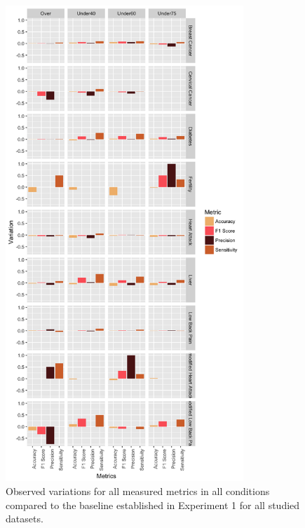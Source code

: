 \begin{figure}[!htbp]
    \centering
    \includegraphics[width=0.8\textwidth]{ThesisTemplate/usingLatex/chapter5Images/AllMetricsPortrait.png}
    \caption{Observed variations for all measured metrics in all conditions compared to the baseline established in Experiment 1 for all studied datasets.}
    \label{fig:allVar}
\end{figure}

